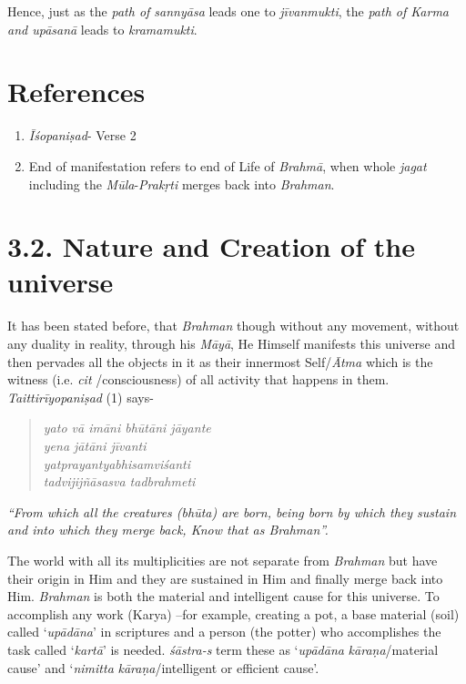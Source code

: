 Hence, just as the \emph{path of sannyāsa} leads one to \emph{jīvanmukti}, the \emph{path of Karma and upāsanā} leads to \emph{kramamukti}.

\section*{References}

\begin{enumerate}
\itemsep=0pt
\item
  \emph{Īśopaniṣad}- Verse 2
\item
  End of manifestation refers to end of Life of \emph{Brahmā}, when whole \emph{jagat} including the \emph{Mūla}-\emph{Prakṛti} merges back into \emph{Brahman}.
\end{enumerate}

\section*{3.2. Nature and Creation of the universe}

It has been stated before, that \emph{Brahman} though without any movement, without any duality in reality, through his \emph{Māyā}, He Himself manifests this universe and then pervades all the objects in it as their innermost Self/\emph{Ātma} which is the witness (i.e. \emph{cit} /consciousness) of all activity that happens in them. \emph{Taittirīyopaniṣad} (1) says-

\begin{verse}
\emph{yato vā imāni bhūtāni jāyante}\\
\emph{yena jātāni jīvanti}\\
\emph{yatprayantyabhisamviśanti}\\
\emph{tadvijijñāsasva tadbrahmeti }
\end{verse}

\emph{``From which all the creatures (bhūta) are born, being born by which they sustain and into which they merge back, Know that as Brahman''.}

The world with all its multiplicities are not separate from \emph{Brahman} but have their origin in Him and they are sustained in Him and finally merge back into Him. \emph{Brahman} is both the material and intelligent cause for this universe. To accomplish any work (Karya) --for example, creating a pot, a base material (soil) called `\emph{upādāna}' in scriptures and a person (the potter) who accomplishes the task called `\emph{kartā}' is needed. \emph{śāstra-s} term these as `\emph{upādāna} \emph{kāraṇa}/material cause' and `\emph{nimitta} \emph{kāraṇa}/intelligent or efficient cause'.


